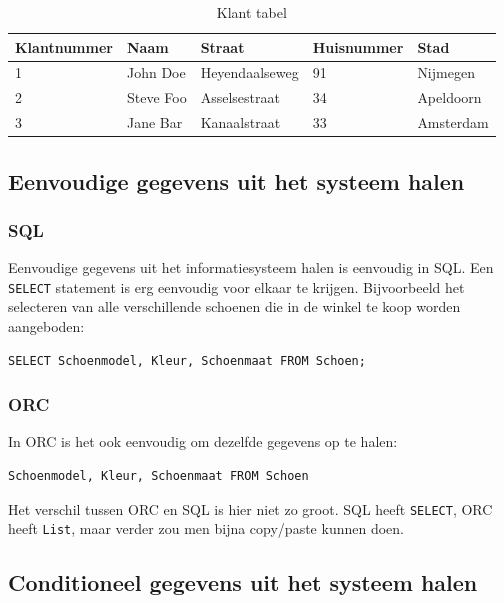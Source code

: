 \documentclass{article}
\begin{document}
\begin{table}[htb]
  \centering
  \begin{tabular}{l|l|l|l|l}
    \textbf{Klantnummer} & \textbf{Naam} & \textbf{Straat} & \textbf{Huisnummer} & \textbf{Stad} \\
    \hline
    1 & John Doe & Heyendaalseweg & 91 & Nijmegen \\
    2 & Steve Foo & Asselsestraat & 34 & Apeldoorn \\
    3 & Jane Bar  & Kanaalstraat  & 33 & Amsterdam \\
  \end{tabular}
  \caption{Klant tabel}
  \label{tab:klant}
\end{table}

\subsection{Eenvoudige gegevens uit het systeem halen}

\subsubsection{SQL}

Eenvoudige gegevens uit het informatiesysteem halen is eenvoudig in SQL. Een
\verb+SELECT+ statement is erg eenvoudig voor elkaar te krijgen. Bijvoorbeeld
het selecteren van alle verschillende schoenen die in de winkel te koop worden
aangeboden:

\begin{verbatim}
SELECT Schoenmodel, Kleur, Schoenmaat FROM Schoen;
\end{verbatim}

\subsubsection{ORC}

In ORC is het ook eenvoudig om dezelfde gegevens op te halen:

\begin{verbatim}
Schoenmodel, Kleur, Schoenmaat FROM Schoen
\end{verbatim}

Het verschil tussen ORC en SQL is hier niet zo groot. SQL heeft \verb+SELECT+,
ORC heeft \verb+List+, maar verder zou men bijna copy/paste kunnen doen.

\subsection{Conditioneel gegevens uit het systeem halen}
\end{document}
